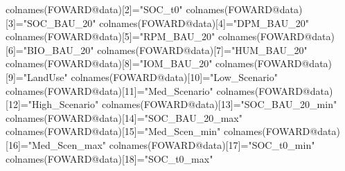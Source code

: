 \documentclass[
  10pt,
  b5paper,
]{book}
\newenvironment{Shaded}{\begin{snugshade}}{\end{snugshade}}
\newcommand{\DecValTok}[1]{\textcolor[rgb]{0.00,0.00,0.81}{#1}}
\newcommand{\FunctionTok}[1]{\textcolor[rgb]{0.00,0.00,0.00}{#1}}
\newcommand{\NormalTok}[1]{#1}
\newcommand{\OtherTok}[1]{\textcolor[rgb]{0.56,0.35,0.01}{#1}}
\newcommand{\SpecialCharTok}[1]{\textcolor[rgb]{0.00,0.00,0.00}{#1}}
\newcommand{\StringTok}[1]{\textcolor[rgb]{0.31,0.60,0.02}{#1}}
\begin{document}
\begin{Shaded}
\begin{Highlighting}[]
\FunctionTok{colnames}\NormalTok{(FOWARD}\SpecialCharTok{@}\NormalTok{data)[}\DecValTok{2}\NormalTok{]}\OtherTok{=}\StringTok{"SOC\_t0"}
\FunctionTok{colnames}\NormalTok{(FOWARD}\SpecialCharTok{@}\NormalTok{data)[}\DecValTok{3}\NormalTok{]}\OtherTok{=}\StringTok{"SOC\_BAU\_20"}
\FunctionTok{colnames}\NormalTok{(FOWARD}\SpecialCharTok{@}\NormalTok{data)[}\DecValTok{4}\NormalTok{]}\OtherTok{=}\StringTok{"DPM\_BAU\_20"}
\FunctionTok{colnames}\NormalTok{(FOWARD}\SpecialCharTok{@}\NormalTok{data)[}\DecValTok{5}\NormalTok{]}\OtherTok{=}\StringTok{"RPM\_BAU\_20"}
\FunctionTok{colnames}\NormalTok{(FOWARD}\SpecialCharTok{@}\NormalTok{data)[}\DecValTok{6}\NormalTok{]}\OtherTok{=}\StringTok{"BIO\_BAU\_20"}
\FunctionTok{colnames}\NormalTok{(FOWARD}\SpecialCharTok{@}\NormalTok{data)[}\DecValTok{7}\NormalTok{]}\OtherTok{=}\StringTok{"HUM\_BAU\_20"}
\FunctionTok{colnames}\NormalTok{(FOWARD}\SpecialCharTok{@}\NormalTok{data)[}\DecValTok{8}\NormalTok{]}\OtherTok{=}\StringTok{"IOM\_BAU\_20"}
\FunctionTok{colnames}\NormalTok{(FOWARD}\SpecialCharTok{@}\NormalTok{data)[}\DecValTok{9}\NormalTok{]}\OtherTok{=}\StringTok{"LandUse"}
\FunctionTok{colnames}\NormalTok{(FOWARD}\SpecialCharTok{@}\NormalTok{data)[}\DecValTok{10}\NormalTok{]}\OtherTok{=}\StringTok{"Low\_Scenario"}
\FunctionTok{colnames}\NormalTok{(FOWARD}\SpecialCharTok{@}\NormalTok{data)[}\DecValTok{11}\NormalTok{]}\OtherTok{=}\StringTok{"Med\_Scenario"}
\FunctionTok{colnames}\NormalTok{(FOWARD}\SpecialCharTok{@}\NormalTok{data)[}\DecValTok{12}\NormalTok{]}\OtherTok{=}\StringTok{"High\_Scenario"}
\FunctionTok{colnames}\NormalTok{(FOWARD}\SpecialCharTok{@}\NormalTok{data)[}\DecValTok{13}\NormalTok{]}\OtherTok{=}\StringTok{"SOC\_BAU\_20\_min"}
\FunctionTok{colnames}\NormalTok{(FOWARD}\SpecialCharTok{@}\NormalTok{data)[}\DecValTok{14}\NormalTok{]}\OtherTok{=}\StringTok{"SOC\_BAU\_20\_max"}
\FunctionTok{colnames}\NormalTok{(FOWARD}\SpecialCharTok{@}\NormalTok{data)[}\DecValTok{15}\NormalTok{]}\OtherTok{=}\StringTok{"Med\_Scen\_min"}
\FunctionTok{colnames}\NormalTok{(FOWARD}\SpecialCharTok{@}\NormalTok{data)[}\DecValTok{16}\NormalTok{]}\OtherTok{=}\StringTok{"Med\_Scen\_max"}
\FunctionTok{colnames}\NormalTok{(FOWARD}\SpecialCharTok{@}\NormalTok{data)[}\DecValTok{17}\NormalTok{]}\OtherTok{=}\StringTok{"SOC\_t0\_min"}
\FunctionTok{colnames}\NormalTok{(FOWARD}\SpecialCharTok{@}\NormalTok{data)[}\DecValTok{18}\NormalTok{]}\OtherTok{=}\StringTok{"SOC\_t0\_max"}




\end{Highlighting}
\end{Shaded}
\end{document}
